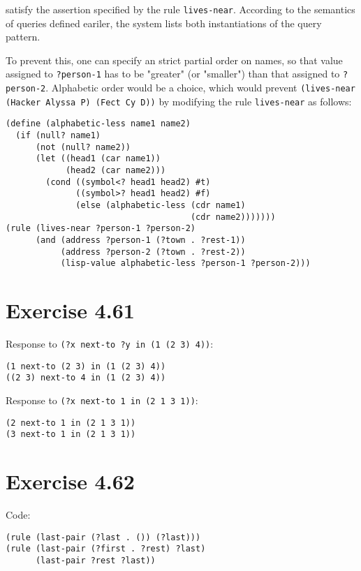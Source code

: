\documentclass[../main.tex]{subfiles}
\begin{document}
satisfy the assertion specified by the rule \lstinline{lives-near}. According to the semantics of queries defined eariler, the system lists both instantiations of the query pattern.

To prevent this, one can specify an strict partial order on names, so that value assigned to \lstinline{?person-1} has to be "greater" (or "smaller") than that assigned to \lstinline{?person-2}. Alphabetic order would be a choice, which would prevent \lstinline{(lives-near (Hacker Alyssa P) (Fect Cy D))} by modifying the rule \lstinline{lives-near} as follows:

\begin{lstlisting}
(define (alphabetic-less name1 name2)
  (if (null? name1)
      (not (null? name2))
      (let ((head1 (car name1))
            (head2 (car name2)))
        (cond ((symbol<? head1 head2) #t)
              ((symbol>? head1 head2) #f)
              (else (alphabetic-less (cdr name1)
                                     (cdr name2)))))))
(rule (lives-near ?person-1 ?person-2)
      (and (address ?person-1 (?town . ?rest-1))
           (address ?person-2 (?town . ?rest-2))
           (lisp-value alphabetic-less ?person-1 ?person-2)))
\end{lstlisting}

\section{Exercise 4.61}

Response to \lstinline{(?x next-to ?y in (1 (2 3) 4))}:

\begin{lstlisting}
(1 next-to (2 3) in (1 (2 3) 4))
((2 3) next-to 4 in (1 (2 3) 4))
\end{lstlisting}

Response to \lstinline{(?x next-to 1 in (2 1 3 1))}:

\begin{lstlisting}
(2 next-to 1 in (2 1 3 1))
(3 next-to 1 in (2 1 3 1))
\end{lstlisting}

\section{Exercise 4.62}

Code:

\begin{lstlisting}
(rule (last-pair (?last . ()) (?last)))
(rule (last-pair (?first . ?rest) ?last)
      (last-pair ?rest ?last))
\end{lstlisting}
\end{document}
